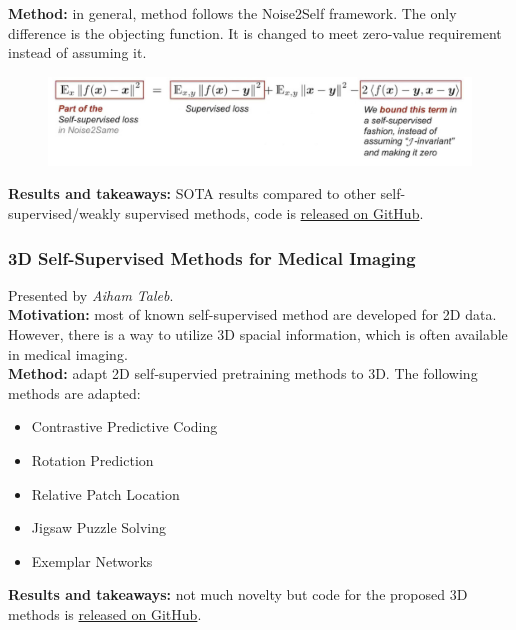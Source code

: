 {\bf Method:} in general, method follows the Noise2Self framework. The only difference is the objecting function. It is changed to meet zero-value requirement instead of assuming it. \\

\begin{figure}[h!]
    \centering
    \includegraphics[scale=0.4]{neurips-2020/images/Screenshot 2020-12-12 at 14.58.30.png}
\end{figure} 

{\bf Results and takeaways:} SOTA results compared to other self-supervised/weakly supervised methods, code is \href{https://github.com/divelab/Noise2Same}{released on GitHub}. \\




\subsubsection{3D Self-Supervised Methods for Medical Imaging \cite{TalebLDSGBL20}}

Presented by \textit{Aiham Taleb}.  \\

{\bf Motivation:} most of known self-supervised method are developed for 2D data. However, there is a way to utilize 3D spacial information, which is often available in medical imaging. \\

{\bf Method:} adapt 2D self-supervied pretraining methods to 3D. The following methods are adapted: 
\begin{itemize}
    \item Contrastive Predictive Coding
    \item Rotation Prediction
    \item Relative Patch Location
    \item Jigsaw Puzzle Solving
    \item Exemplar Networks
\end{itemize} 

{\bf Results and takeaways:} not much novelty but code for the proposed 3D methods is \href{https://github.com/HealthML/self-supervised-3d-tasks}{released on GitHub}. \\